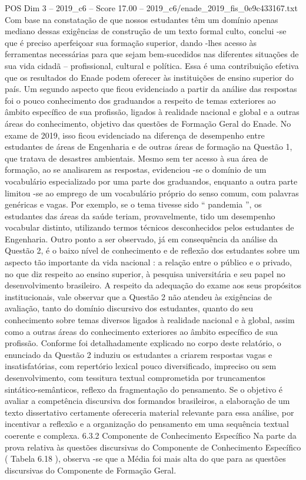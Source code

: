 \begin{textsample}{POS Dim 3 – 2019\_c6 – Score 17.00 – 2019\_c6/enade\_2019\_fis\_0e9c433167.txt}
Com base na constatação de que nossos estudantes têm um domínio apenas mediano dessas exigências de construção de um texto formal culto, conclui -se que é preciso aperfeiçoar sua formação superior, dando -lhes acesso às ferramentas necessárias para que sejam bem-sucedidos nas diferentes situações de sua vida cidadã – profissional, cultural e política.
Essa é uma contribuição efetiva que os resultados do Enade podem oferecer às instituições de ensino superior do país.
Um segundo aspecto que ficou evidenciado a partir da análise das respostas foi o pouco conhecimento dos graduandos a respeito de temas exteriores ao âmbito específico de sua profissão, ligados à realidade nacional e global e a outras áreas do conhecimento, objetivo das questões de Formação Geral do Enade.
No exame de 2019, isso ficou evidenciado na diferença de desempenho entre estudantes de áreas de Engenharia e de outras áreas de formação na Questão 1, que tratava de desastres ambientais.
Mesmo sem ter acesso à sua área de formação, ao se analisarem as respostas, evidenciou -se o domínio de um vocabulário especializado por uma parte dos graduandos, enquanto a outra parte limitou -se ao emprego de um vocabulário próprio do senso comum, com palavras genéricas e vagas.
Por exemplo, se o tema tivesse sido “ pandemia ”, os estudantes das áreas da saúde teriam, provavelmente, tido um desempenho vocabular distinto, utilizando termos técnicos desconhecidos pelos estudantes de Engenharia.
Outro ponto a ser observado, já em consequência da análise da Questão 2, é o baixo nível de conhecimento e de reflexão dos estudantes sobre um aspecto tão importante da vida nacional : a relação entre o público e o privado, no que diz respeito ao ensino superior, à pesquisa universitária e seu papel no desenvolvimento brasileiro.
A respeito da adequação do exame aos seus propósitos institucionais, vale observar que a Questão 2 não atendeu às exigências de avaliação, tanto do domínio discursivo dos estudantes, quanto do seu conhecimento sobre temas diversos ligados à realidade nacional e à global, assim como a outras áreas do conhecimento exteriores ao âmbito específico de sua profissão.
Conforme foi detalhadamente explicado no corpo deste relatório, o enunciado da Questão 2 induziu os estudantes a criarem respostas vagas e insatisfatórias, com repertório lexical pouco diversificado, impreciso ou sem desenvolvimento, com tessitura textual comprometida por truncamentos sintático-semânticos, reflexo da fragmentação do pensamento.
Se o objetivo é avaliar a competência discursiva dos formandos brasileiros, a elaboração de um texto dissertativo certamente ofereceria material relevante para essa análise, por incentivar a reflexão e a organização do pensamento em uma sequência textual coerente e complexa. 6.3.2 Componente de Conhecimento Específico Na parte da prova relativa às questões discursivas do Componente de Conhecimento Específico ( Tabela 6.18 ), observa -se que a Média foi mais alta do que para as questões discursivas do Componente de Formação Geral.

\end{textsample}
